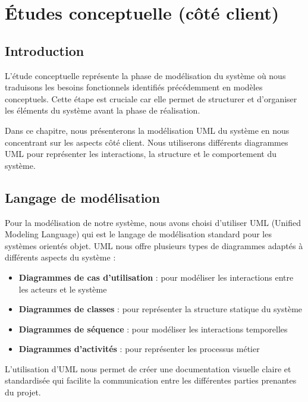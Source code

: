 \documentclass[12pt,a4paper]{report}
\begin{document}
\newpage

\chapter{Études conceptuelle (côté client)}

\section{Introduction}

L'étude conceptuelle représente la phase de modélisation du système où nous traduisons les besoins fonctionnels identifiés précédemment en modèles conceptuels. Cette étape est cruciale car elle permet de structurer et d'organiser les éléments du système avant la phase de réalisation.

Dans ce chapitre, nous présenterons la modélisation UML du système en nous concentrant sur les aspects côté client. Nous utiliserons différents diagrammes UML pour représenter les interactions, la structure et le comportement du système.

\section{Langage de modélisation}

Pour la modélisation de notre système, nous avons choisi d'utiliser UML (Unified Modeling Language) qui est le langage de modélisation standard pour les systèmes orientés objet. UML nous offre plusieurs types de diagrammes adaptés à différents aspects du système :

\begin{itemize}
    \item \textbf{Diagrammes de cas d'utilisation} : pour modéliser les interactions entre les acteurs et le système
    \item \textbf{Diagrammes de classes} : pour représenter la structure statique du système
    \item \textbf{Diagrammes de séquence} : pour modéliser les interactions temporelles
    \item \textbf{Diagrammes d'activités} : pour représenter les processus métier
\end{itemize}

L'utilisation d'UML nous permet de créer une documentation visuelle claire et standardisée qui facilite la communication entre les différentes parties prenantes du projet.
\end{document}
